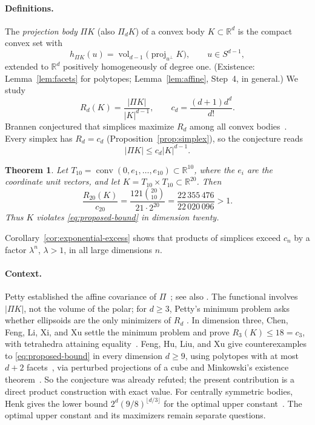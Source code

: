 \documentclass[11pt]{article}
\newtheorem{theorem}{Theorem}
\newcommand{\R}{\mathbb R}
\DeclareMathOperator{\conv}{conv}
\DeclareMathOperator{\vol}{vol}
\DeclareMathOperator{\proj}{proj}
\begin{document}
\paragraph{Definitions.}
The \emph{projection body} \(\Pi K\) (also \(\Pi_dK\)) of a convex body \(K\subset\R^d\) is the compact convex set with
\[
 h_{\Pi K}(u)=\vol_{d-1}\bigl(\proj_{u^\perp}K\bigr),\qquad u\in S^{d-1},
\]
extended to \(\R^d\) positively homogeneously of degree one. (Existence: Lemma~\ref{lem:facets} for polytopes; Lemma~\ref{lem:affine}, Step~4, in general.) We study
\begin{equation}\label{eq:functional}
 R_d(K)=\frac{|\Pi K|}{|K|^{d-1}},
 \qquad c_d=\frac{(d+1)d^d}{d!}.
\end{equation}
Brannen conjectured that simplices maximize \(R_d\) among all convex bodies~\cite{Brannen}. Every simplex has \(R_d=c_d\) (Proposition~\ref{prop:simplex}), so the conjecture reads
\begin{equation}\label{eq:proposed-bound}
 |\Pi K|\le c_d|K|^{d-1}.
\end{equation}

\begin{theorem}\label{thm:counterexample}
Let \(T_{10}=\conv(0,e_1,\ldots,e_{10})\subset\R^{10}\), where the
\(e_i\) are the coordinate unit vectors, and let
\(K=T_{10}\times T_{10}\subset\R^{20}\). Then
\[
 \frac{R_{20}(K)}{c_{20}}
 =\frac{121\binom{20}{10}}{21\cdot2^{20}}
 =\frac{22\,355\,476}{22\,020\,096}>1.
\]
Thus \(K\) violates \eqref{eq:proposed-bound} in dimension twenty.
\end{theorem}

Corollary~\ref{cor:exponential-excess} shows that products of simplices exceed \(c_n\) by a factor \(\lambda^n\), \(\lambda>1\), in all large dimensions \(n\).

\paragraph{Context.}
Petty established the affine covariance of \(\Pi\)~\cite{Petty}; see also \cite[Equation~(1)]{Ludwig}. The functional involves \(|\Pi K|\), not the volume of the polar; for \(d\ge3\), Petty's minimum problem asks whether ellipsoids are the only minimizers of \(R_d\) \cite[Section~1]{Saroglou}. In dimension three, Chen, Feng, Li, Xi, and Xu settle the minimum problem and prove \(R_3(K)\le18=c_3\), with tetrahedra attaining equality~\cite[Theorems~1.1 and~1.2]{ChenEtAl}. Feng, Hu, Liu, and Xu give counterexamples to \eqref{eq:proposed-bound} in every dimension \(d\ge9\), using polytopes with at most \(d+2\) facets~\cite[Theorem~1.3]{FengEtAl}, via perturbed projections of a cube and Minkowski's existence theorem~\cite[Section~4]{FengEtAl}. So the conjecture was already refuted; the present contribution is a direct product construction with exact value. For centrally symmetric bodies, Henk gives the lower bound \(2^d(9/8)^{\lfloor d/3\rfloor}\) for the optimal upper constant~\cite{Henk}. The optimal upper constant and its maximizers remain separate questions.
\end{document}
